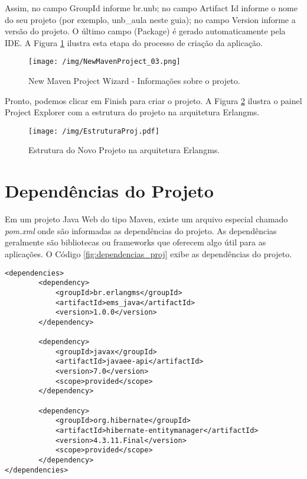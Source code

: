 Assim, no campo GroupId informe br.unb; 
no campo Artifact Id informe o nome do seu projeto (por exemplo, unb\_aula neste guia);
no campo Version informe a versão do projeto. O último
campo (Package) é gerado automaticamente pela IDE. A Figura \ref{fig_new_maven_project_03}
ilustra esta etapa do processo de criação da aplicação.

\begin{figure}[htb]
\centering
\texttt{[image: /img/NewMavenProject\_03.png]}
\caption{New Maven Project Wizard - Informações sobre o projeto.}
\label{fig_new_maven_project_03}
\end{figure}

Pronto, podemos clicar em Finish para criar o projeto. A Figura \ref{fig_estrutura_proj} 
ilustra o painel Project Explorer com a estrutura do projeto na arquitetura Erlangms.


\begin{figure}[htb]
\centering
\texttt{[image: /img/EstruturaProj.pdf]}
\caption{Estrutura do Novo Projeto na arquitetura Erlangms.}
\label{fig_estrutura_proj}
\end{figure}
\FloatBarrier




\section{Dependências do Projeto}

Em um projeto Java Web do tipo Maven, existe um arquivo especial chamado \textit{pom.xml} onde
são informadas as dependências do projeto. As dependências geralmente são bibliotecas 
ou frameworks que oferecem algo útil para as aplicações. O Código \ref{fig:dependencias_proj}
exibe as dependências do projeto.


\renewcommand{\lstlistingname}{Código}             
\begin{lstlisting}[caption=Dependências na nova arquitetura., label=fig:dependencias_proj] 
<dependencies>
		<dependency>
			<groupId>br.erlangms</groupId>
			<artifactId>ems_java</artifactId>
			<version>1.0.0</version>
		</dependency>

		<dependency>
			<groupId>javax</groupId>
			<artifactId>javaee-api</artifactId>
			<version>7.0</version>
			<scope>provided</scope>
		</dependency>

		<dependency>
			<groupId>org.hibernate</groupId>
			<artifactId>hibernate-entitymanager</artifactId>
			<version>4.3.11.Final</version>
			<scope>provided</scope>
		</dependency>
</dependencies>
\end{lstlisting}

